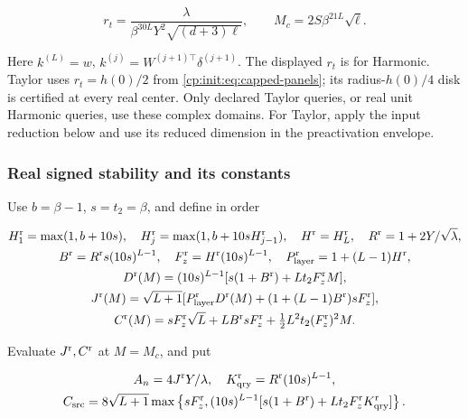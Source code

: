 \begin{equation}
\label{cp:init:eq:source-input}
r_t=\frac{\lambda}{\beta^{30L}Y^2\sqrt{(d+3)\ell}},\qquad
M_c=2S\beta^{21L}\sqrt\ell.
\end{equation}

Here $k^{(L)}=w$, $k^{(j)}=W^{(j+1)\top}\delta^{(j+1)}$.
The displayed $r_t$ is for Harmonic. Taylor uses $r_t=h(0)/2$
from \eqref{cp:init:eq:capped-panels}; its radius-$h(0)/4$ disk
is certified at every real center. Only declared Taylor queries, or real
unit Harmonic queries, use these complex domains. For Taylor, apply the
input reduction below and use its reduced dimension in the preactivation
envelope.

\subsubsection{Real signed stability and its constants}
\label{cp:init:sec:stability}

Use $b=\beta-1$, $s=t_2=\beta$, and define in order

\begin{equation}
\label{cp:init:eq:real-constants}
\begin{gathered}
H_1^{\rm r}=\max(1,b+10s),\quad
H_j^{\rm r}=\max(1,b+10sH_{j-1}^{\rm r}),\quad H^{\rm r}=H_L^{\rm r},\quad
R^{\rm r}=1+2Y/\sqrt\lambda,\\
B^{\rm r}=R^{\rm r}s(10s)^{L-1},\quad
F_z^{\rm r}=H^{\rm r}(10s)^{L-1},\quad
P_{\rm layer}^{\rm r}=1+(L-1)H^{\rm r},\\
D^{\rm r}(M)=(10s)^{L-1}
 [s(1+B^{\rm r})+Lt_2F_z^{\rm r}M],\\
J^{\rm r}(M)=\sqrt{L+1}
 [P_{\rm layer}^{\rm r}D^{\rm r}(M)+(1+(L-1)B^{\rm r})sF_z^{\rm r}],\\
C^{\rm r}(M)=sF_z^{\rm r}\sqrt L+LB^{\rm r}sF_z^{\rm r}
                  +\tfrac12L^2t_2(F_z^{\rm r})^2M.
\end{gathered}
\end{equation}

Evaluate $J^{\rm r},C^{\rm r}$ at $M=M_c$, and put

\begin{equation}
\label{cp:init:eq:real-source-constant}
\begin{gathered}
A_n=4J^{\rm r}Y/\lambda,\quad
K_{\rm qry}^{\rm r}=R^{\rm r}(10s)^{L-1},\\
C_{\rm src}=8\sqrt{L+1}\max\left\{sF_z^{\rm r},
 (10s)^{L-1}[s(1+B^{\rm r})+Lt_2F_z^{\rm r}K_{\rm qry}^{\rm r}]\right\}.
\end{gathered}
\end{equation}

